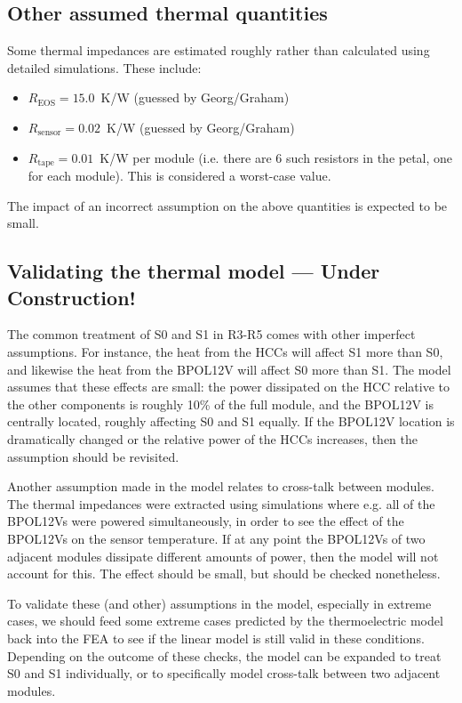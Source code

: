 \subsection{Other assumed thermal quantities}

Some thermal impedances are estimated roughly rather than calculated using detailed simulations.
These include:
%
\begin{itemize}
\item $R_\text{EOS}=15.0$~K/W (guessed by Georg/Graham)
\item $R_\text{sensor}=0.02$~K/W (guessed by Georg/Graham)
\item $R_\text{tape}=0.01$~K/W per module (i.e. there are 6 such resistors in the petal, one
for each module). This is considered a worst-case value.
\end{itemize}
%
The impact of an incorrect assumption on the above quantities is expected to be small.

\subsection{Validating the thermal model --- Under Construction!}
\label{thermal_validation}

The common treatment of S0 and S1 in R3-R5 comes with other imperfect assumptions.
For instance, the heat from the HCCs will affect S1 more than S0, and likewise the heat from the BPOL12V
will affect S0 more than S1. The model assumes that these effects are small: the power dissipated on
the HCC relative to the other components is roughly 10\% of the full module, and the BPOL12V is centrally
located, roughly affecting S0 and S1 equally. If the BPOL12V location is dramatically changed or the
relative power of the HCCs increases, then the assumption should be revisited.

Another assumption made in the model relates to cross-talk between modules. The thermal impedances were
extracted using simulations where e.g. all of the BPOL12Vs were powered simultaneously, in order to see
the effect of the BPOL12Vs on the sensor temperature. If at any point the BPOL12Vs of two adjacent modules
dissipate different amounts of power, then the model will not account for this. The effect should be
small, but should be checked nonetheless.

To validate these (and other) assumptions in the model, especially in extreme cases, we should feed
some extreme cases predicted by the thermoelectric model back into the FEA to see if the linear model
is still valid in these conditions. Depending on the outcome of these checks, the model can be expanded
to treat S0 and S1 individually, or to specifically model cross-talk between two adjacent modules.
